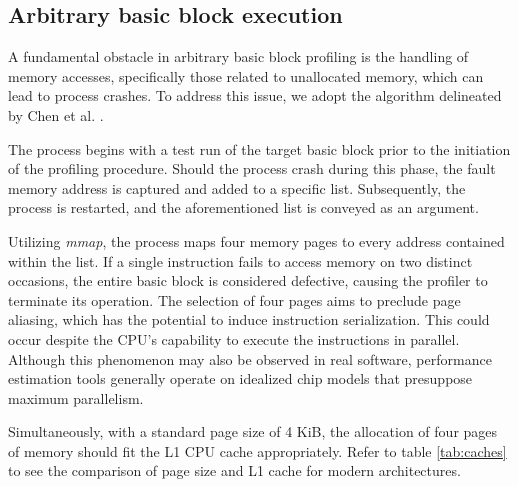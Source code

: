 \subsection{Arbitrary basic block execution}

A fundamental obstacle in arbitrary basic block profiling is the handling of memory accesses, specifically 
those related to unallocated memory, which can lead to process crashes. To address this issue, we adopt 
the algorithm delineated by Chen et al. \cite{chenBHiveBenchmarkSuite2019}.

The process begins with a test run of the target basic block prior to the initiation of the profiling 
procedure. Should the process crash during this phase, the fault memory address is captured and added to 
a specific list. Subsequently, the process is restarted, and the aforementioned list is conveyed as an 
argument.

Utilizing \textit{mmap}, the process maps four memory pages to every address contained within the list. 
If a single instruction fails to access memory on two distinct occasions, the entire basic block is 
considered defective, causing the profiler to terminate its operation. The selection of four pages aims 
to preclude page aliasing, which has the potential to induce instruction serialization. This could occur 
despite the CPU's capability to execute the instructions in parallel. Although this phenomenon may also 
be observed in real software, performance estimation tools generally operate on idealized chip models 
that presuppose maximum parallelism.

Simultaneously, with a standard page size of 4 KiB, the allocation of four pages of memory should fit 
the L1 CPU cache appropriately. Refer to table \ref{tab:caches} to see the comparison of page size and 
L1 cache for modern architectures.

